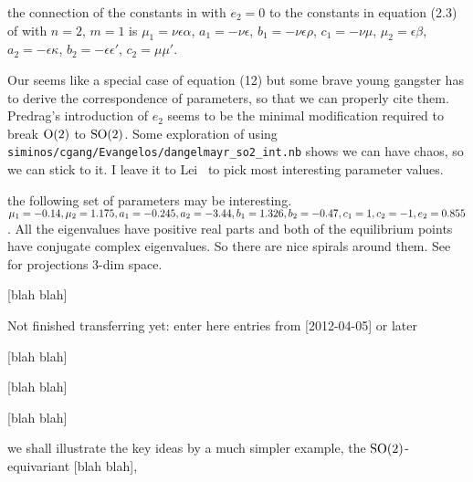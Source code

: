 \documentclass[aip,cha,reprint,
secnumarabic,
nofootinbib, tightenlines,
nobibnotes, showkeys, showpacs,
groupedaddress
]{revtex4-1}
\begin{document}
the connection
of the constants in  with $e_2=0$ to the constants in
equation (2.3) of  with $n=2$, $m=1$ is $\mu_1=\nu\epsilon\alpha$,
$a_1=-\nu\epsilon$, $b_1=-\nu\epsilon\rho$, $c_1=-\nu\mu$, $\mu_2=\epsilon\beta$,
$a_2=-\epsilon\kappa$, $b_2=-\epsilon\epsilon'$, $c_2=\mu\mu'$.

Our  seems like a special case of
{\twoMode} equation (12) but some brave young gangster
has to derive the correspondence of parameters, so that we can properly cite
them. Predrag's introduction of $e_2$
seems to be the minimal modification required to break $\textrm{O}(2)$ to $\textrm{SO}(2)$.
Some exploration of 
using \texttt{siminos/cgang/Evangelos/dangelmayr\_so2\_int.nb}
shows we can have chaos, so we can stick to it. I leave it to Lei \etal\
to pick most interesting parameter values.

the following set of
parameters may be interesting. $\mu_1=-0.14,\mu_2=1.175,
a_1=-0.245,a_2=-3.44, b_1=1.326, b_2=-0.47, c_1=1, c_2=-1, e_2=0.855$. All
the eigenvalues have positive real parts and both of the equilibrium
points have conjugate complex eigenvalues. So there are nice spirals
around them. See \reffig{fig:dangelmayr_proj} for projections
3-dim space.

 [blah blah]

Not finished transferring yet: enter here entries from [2012-04-05] or later

 [blah blah]


 [blah blah]



 [blah blah]

we shall illustrate the key ideas by a much
simpler example, the $\textrm{SO}(2)$-equivariant  [blah blah],
\end{document}

